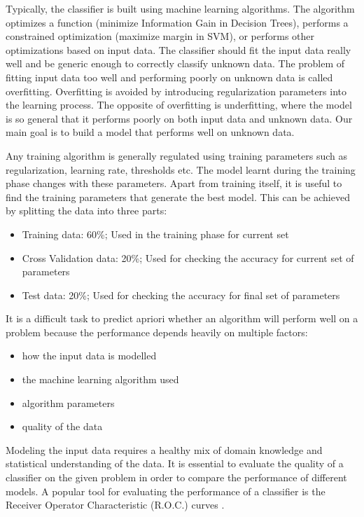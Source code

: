 	Typically, the classifier is built using machine learning algorithms. The algorithm optimizes a function (minimize Information Gain in Decision Trees), performs a constrained optimization (maximize margin in SVM), or performs other optimizations based on input data. The classifier should fit the input data really well and be generic enough to correctly classify unknown data. The problem of fitting input data too well and performing poorly on unknown data is called overfitting. Overfitting is avoided by introducing regularization parameters into the learning process. The opposite of overfitting is underfitting, where the model is so general that it performs poorly on both input data and unknown data. Our main goal is to build a model that performs well on unknown data. \par
	Any training algorithm is generally regulated using training parameters such as regularization, learning rate, thresholds etc. The model learnt during the training phase changes with these parameters. Apart from training itself, it is useful to find the training parameters that generate the best model. This can be achieved by splitting the data into three parts:
	\begin{itemize}
	\item Training data: 60\%; Used in the training phase for current set 
	\item Cross Validation data: 20\%; Used for checking the accuracy for current set of parameters
	\item Test data: 20\%; Used for checking the accuracy for final set of parameters
	\end{itemize}
	
	It is a difficult task to predict apriori whether an algorithm will perform well on a problem because the performance depends heavily on multiple factors: 
	\begin{itemize}
	\item how the input data is modelled
	\item the machine learning algorithm used
	\item algorithm parameters
	\item quality of the data
	\end{itemize}
	Modeling the input data requires a healthy mix of domain knowledge and statistical understanding of the data. It is essential to evaluate the quality of a classifier on the given problem in order to compare the performance of different models. A popular tool for evaluating the performance of a classifier is the Receiver Operator Characteristic (R.O.C.) curves \cite{roc}.

